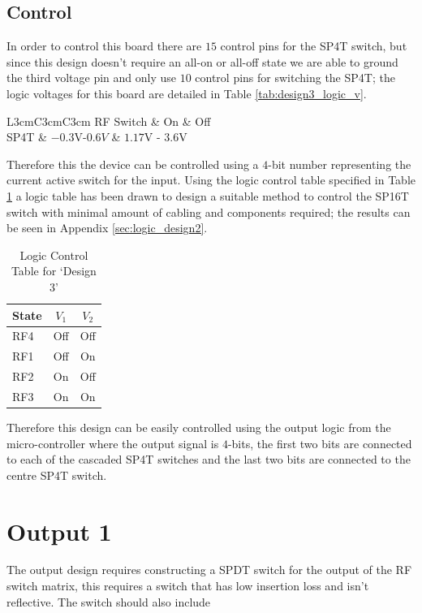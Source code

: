 \documentclass[12pt,openany,a4paper]{book}
\begin{document}
\subsection{Control}
In order to control this  board there are $15$ control pins for the SP4T switch, but since this design doesn't require an all-on or all-off state we are able to ground the third voltage pin and only use $10$ control pins for switching the SP4T; the logic voltages for this board are detailed in Table \ref{tab:design3_logic_v}.
\begin{table}[H]
	\centering
	\begin{tabular}{L{3cm}C{3cm}C{3cm}}
	\hline
	RF Switch & On & Off\\
	\hline
	SP4T & $-0.3$V-$0.6V$ & $1.17$V - $3.6$V \\
	\hline	
	\end{tabular}
	\caption{Logic Voltage Control}
	\label{tab:design3_logic_v}
\end{table}
Therefore this the device can be controlled using a $4$-bit number representing the current active switch for the input. Using the logic control table specified in Table \ref{tab:logic-cont-design3} a logic table has been drawn to design a suitable method to control the SP16T switch with minimal amount of cabling and components required; the results can be seen in Appendix \ref{sec:logic_design2}. 
\begin{table}[H]
	\centering
	\begin{tabular}{l c c }
		\hline
		State & $V_1$ & $V_2$\\
		\hline
		RF4 & Off & Off \\
		RF1 & Off & On \\
		RF2 & On & Off\\
		RF3 & On & On	\\	
		\hline
	\end{tabular}
    \caption{Logic Control Table for `Design 3'} \label{tab:logic-cont-design3}
\end{table}
Therefore this design can be easily controlled using the output logic from the micro-controller where the output signal is $4$-bits, the first two bits are connected to each of the cascaded SP4T switches and the last two bits are connected to the centre SP4T switch.


\section{Output 1}		\label{sec:output1}
The output design requires constructing a SPDT switch for the output of the RF switch matrix, this requires a switch that has low insertion loss and isn't reflective. The switch should also include 
\end{document}
